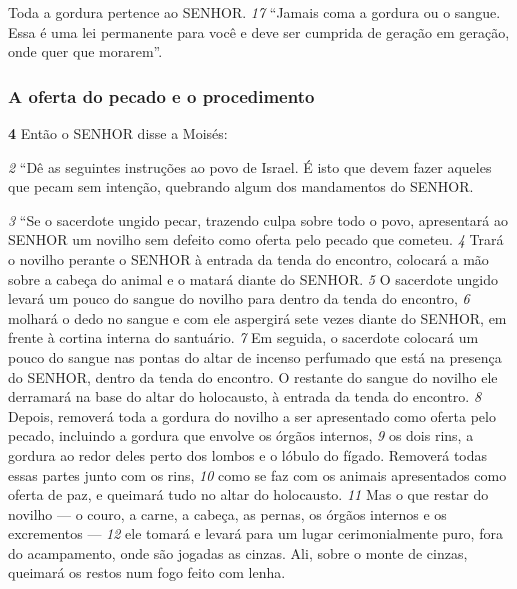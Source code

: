 \smallskip
Toda a gordura pertence ao SENHOR.
\textit{\tiny 17}
“Jamais coma a gordura ou o sangue. Essa é uma lei permanente para você e
deve ser cumprida de geração em geração, onde quer que morarem”.
  
\bigskip
\subsubsection*{A oferta do pecado e o procedimento}
\textbf{\large 4} Então o SENHOR disse a Moisés: 

\smallskip
\textit{\tiny 2} 
“Dê as seguintes instruções ao povo de Israel.
É isto que devem fazer aqueles que pecam sem intenção, quebrando algum dos
mandamentos do SENHOR. 

\smallskip
\textit{\tiny 3} 
“Se o sacerdote ungido pecar, trazendo culpa sobre todo o povo, apresentará
ao SENHOR um novilho sem defeito como oferta pelo pecado que cometeu. 
\textit{\tiny 4} 
Trará
o novilho perante o SENHOR à entrada da tenda do encontro, colocará a mão sobre
a cabeça do animal e o matará diante do SENHOR. 
\textit{\tiny 5} 
O sacerdote ungido levará um
pouco do sangue do novilho para dentro da tenda do encontro, 
\textit{\tiny 6} 
molhará o dedo
no sangue e com ele aspergirá sete vezes diante do SENHOR, em frente à cortina
interna do santuário. 
\textit{\tiny 7} 
Em seguida, o sacerdote colocará um pouco do sangue nas
pontas do altar de incenso perfumado que está na presença do SENHOR, dentro da
tenda do encontro. O restante do sangue do novilho ele derramará na base do
altar do holocausto, à entrada da tenda do encontro. 
\textit{\tiny 8} 
Depois, removerá toda a
gordura do novilho a ser apresentado como oferta pelo pecado, incluindo a
gordura que envolve os órgãos internos, 
\textit{\tiny 9} 
os dois rins, a gordura ao redor deles
perto dos lombos e o lóbulo do fígado. Removerá todas essas partes junto com os
rins, 
\textit{\tiny 10}
como se faz com os animais apresentados como oferta de paz, e queimará
tudo no altar do holocausto. 
\textit{\tiny 11}
Mas o que restar do novilho — o couro, a carne, a
cabeça, as pernas, os órgãos internos e os excrementos — 
\textit{\tiny 12}
ele tomará e levará
para um lugar cerimonialmente puro, fora do acampamento, onde são jogadas as
cinzas. Ali, sobre o monte de cinzas, queimará os restos num fogo feito com
lenha.
   
